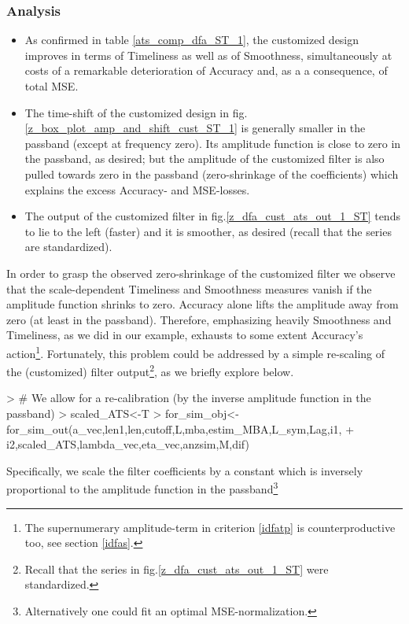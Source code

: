 \documentclass[a4paper]{book}
\begin{document}
\subsubsection{Analysis}
\begin{itemize}
\item As confirmed in table \ref{ats_comp_dfa_ST_1}, the customized design improves in terms of Timeliness as well as of Smoothness, {simultaneously} at costs of a remarkable deterioration of Accuracy and, as a a consequence, of total MSE.
\item The time-shift of the customized design in fig.\ref{z_box_plot_amp_and_shift_cust_ST_1} is generally smaller in the passband (except at frequency zero). Its amplitude function is close to zero in the passband, as desired;  but the amplitude of the customized filter is also pulled towards zero in the passband (zero-shrinkage of the coefficients) which explains the excess Accuracy- and MSE-losses.   
\item The output of the customized filter in fig.\ref{z_dfa_cust_ats_out_1_ST} tends to lie to the left (faster) and it is smoother, as desired (recall that the series are standardized).
\end{itemize}
In order to grasp the observed zero-shrinkage of the customized filter we observe that  the scale-dependent Timeliness and Smoothness measures vanish if the amplitude function shrinks to zero. Accuracy alone lifts the amplitude away from zero (at least in the passband). Therefore, emphasizing heavily Smoothness and Timeliness, as we did in our example, exhausts to some extent Accuracy's action\footnote{The supernumerary amplitude-term in criterion \ref{idfatp} is counterproductive too, see section \ref{idfas}.}. Fortunately, this problem could be addressed by a simple re-scaling of the (customized) filter output\footnote{Recall that the series in fig.\ref{z_dfa_cust_ats_out_1_ST} were standardized.}, as we briefly explore below. 
\begin{Schunk}
\begin{Sinput}
> # We allow for a re-calibration (by the inverse amplitude function in the passband)
> scaled_ATS<-T
> for_sim_obj<-for_sim_out(a_vec,len1,len,cutoff,L,mba,estim_MBA,L_sym,Lag,i1,
+                         i2,scaled_ATS,lambda_vec,eta_vec,anzsim,M,dif)
\end{Sinput}
\end{Schunk}
Specifically, we scale the filter coefficients by a constant which is inversely proportional to the  amplitude function in the passband\footnote{Alternatively one could fit an optimal MSE-normalization.}
\end{document}
